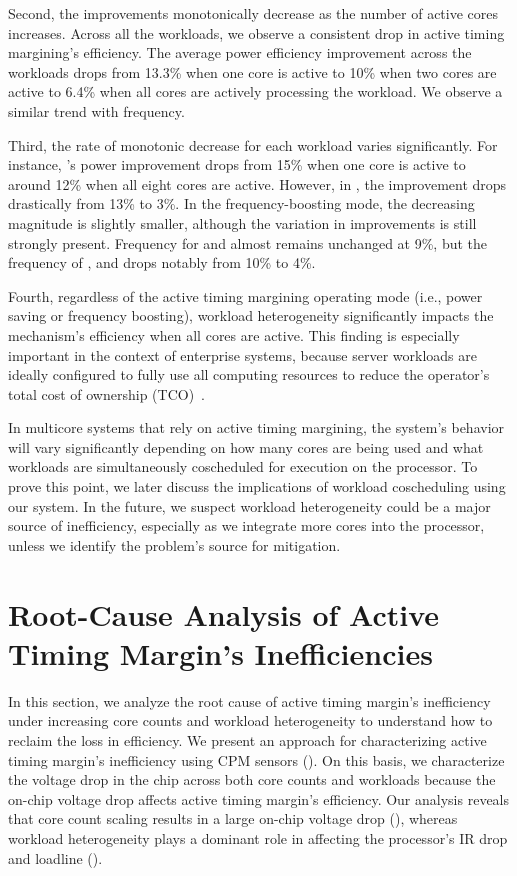 Second, the improvements monotonically decrease as the number of active cores increases. Across all the workloads, we observe a consistent drop in active timing margining's efficiency. The average power efficiency improvement across the workloads drops from 13.3\% when one core is active to 10\% when two cores are active to 6.4\% when all cores are actively processing the workload. We observe a similar trend with frequency.

Third, the rate of monotonic decrease for each workload varies significantly. For instance, 's power improvement drops from 15\% when one core is active to around 12\% when all eight cores are active. However, in , the improvement drops drastically from 13\% to 3\%. In the frequency-boosting mode, the decreasing magnitude is slightly smaller, although the variation in improvements is still strongly present. Frequency for  and  almost remains unchanged at 9\%, but the frequency of ,  and  drops notably from 10\% to 4\%.

Fourth, regardless of the active timing margining operating mode (i.e., power saving or frequency boosting), workload heterogeneity significantly impacts the mechanism's efficiency when all cores are active. This finding is especially important in the context of enterprise systems, because server workloads are ideally configured to fully use all computing resources to reduce the operator's total cost of ownership (TCO)~\cite{barroso2007case}. 

In multicore systems that rely on active timing margining, the system's behavior will vary significantly depending on how many cores are being used and what workloads are simultaneously coscheduled for execution on the processor. To prove this point, we later discuss the implications of workload coscheduling using our system. In the future, we suspect workload heterogeneity could be a major source of inefficiency, especially as we integrate more cores into the processor, unless we identify the problem's source for mitigation.

\section{Root-Cause Analysis of Active Timing Margin's Inefficiencies}
\label{sec:voltage:rootcause}

In this section, we analyze the root cause of active timing margin's inefficiency under increasing core counts and workload heterogeneity to understand how to reclaim the loss in efficiency. We present an approach for characterizing active timing margin's inefficiency using CPM sensors (). On this basis, we characterize the voltage drop in the chip across both core counts and workloads because the on-chip voltage drop affects active timing margin's efficiency. Our analysis reveals that core count scaling results in a large on-chip voltage drop (), whereas workload heterogeneity plays a dominant role in affecting the processor's IR drop and loadline ().

